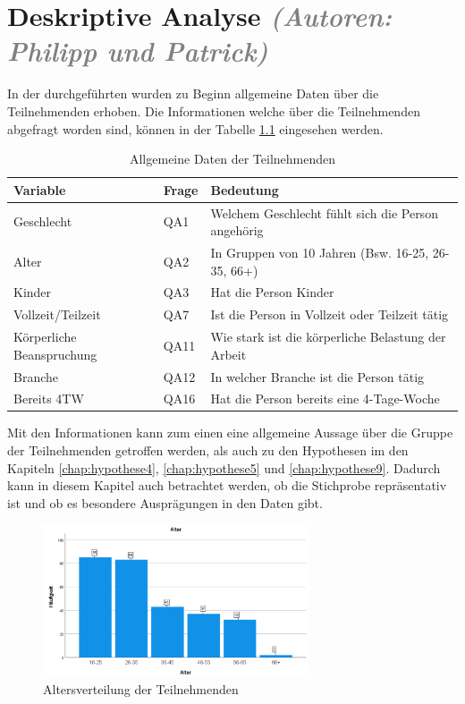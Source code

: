 \chapter{Deskriptive Analyse \textit{\textcolor{gray}{(Autoren: Philipp und Patrick)}}}

In der durchgeführten wurden zu Beginn allgemeine Daten über die Teilnehmenden erhoben.
Die Informationen welche über die Teilnehmenden abgefragt worden sind, können in der Tabelle
\ref{tab:allgemeine_daten} eingesehen werden.

\begin{table}[h]
    \centering
    \begin{tabular}{|l|l|p{8cm}|}
        \hline
        \textbf{Variable} & \textbf{Frage} & \textbf{Bedeutung}\\
        \hline
        Geschlecht & QA1 & Welchem Geschlecht fühlt sich die Person angehörig\\\hline
        Alter & QA2 & In Gruppen von 10 Jahren (Bsw. 16-25, 26-35, 66+)\\\hline
        Kinder & QA3 & Hat die Person Kinder\\\hline
        Vollzeit/Teilzeit & QA7 & Ist die Person in Vollzeit oder Teilzeit tätig\\\hline
        Körperliche Beanspruchung & QA11 & Wie stark ist die körperliche Belastung der Arbeit\\\hline
        Branche & QA12 & In welcher Branche ist die Person tätig\\\hline
        Bereits 4TW & QA16 & Hat die Person bereits eine 4-Tage-Woche\\\hline
    \end{tabular}
    \caption{Allgemeine Daten der Teilnehmenden}
    \label{tab:allgemeine_daten}
\end{table}

Mit den Informationen kann zum einen eine allgemeine Aussage über die Gruppe der Teilnehmenden 
getroffen werden, als auch zu den Hypothesen im den Kapiteln \ref{chap:hypothese4},
\ref{chap:hypothese5} und \ref{chap:hypothese9}. Dadurch kann in diesem Kapitel auch betrachtet
werden, ob die Stichprobe repräsentativ ist und ob es besondere Ausprägungen in den Daten gibt.

\begin{figure}[h]
    \centering
    \includegraphics[width=0.7\textwidth]{04_Artefakte/01_Abbildungen/deskriptiv_alter.png}
    \caption{Altersverteilung der Teilnehmenden}
    \label{fig:altersverteilung}
\end{figure}

